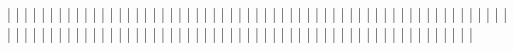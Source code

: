 |                                           |
|                                           |
|                                           |
|                                           |
|                                           |
|                                           |
|                                           |
|                                           |
|                                           |
|                                           |
|                                           |
|                                           |
|                                           |
|                                           |
|                                           |
|                                           |
|                                           |
|                                           |
|                                           |
|                                           |
|                                           |
|                                           |
|                                           |
|                                           |
|                                           |
|                                           |
|                                           |
|                                           |
|                                           |
|                                           |
|                                           |
|                                           |
|                                           |
|                                           |
|                                           |
|                                           |
|                                           |
|                                           |
|                                           |
|                                           |
|                                           |
|                                           |
|                                           |
|                                           |
|                                           |
|                                           |
|                                           |
|                                           |
|                                           |
|                                           |
|                                           |
|                                           |
|                                           |
|                                           |
|                                           |
|                                           |
|                                           |

